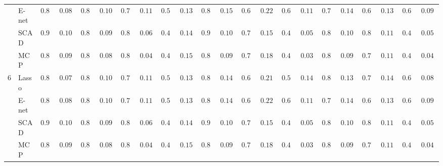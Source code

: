 \begin{tabular}{llllllllllllllllllllll}
	& E-net  & $0.828$ & $0.0854$ & $0.804$ & $0.1024$ & $0.792$ & $0.1169$ & $0.568$ & $0.1325$ & $0.832$ & $0.1576$ & $0.634$ & $0.2203$ & $0.670$ & $0.1115$ & $0.794$ & $0.1462$ & $0.680$ & $0.1303$ & $0.644$ & $0.0925$ \\
	& SCAD  & $0.900$ & $0.1005$ & $0.880$ & $0.0985$ & $0.828$ & $0.0697$ & $0.450$ & $0.1460$ & $0.900$ & $0.1005$ & $0.782$ & $0.1533$ & $0.414$ & $0.0513$ & $0.860$ & $0.1005$ & $0.814$ & $0.1110$ & $0.412$ & $0.0556$ \\
	& MCP  & $0.864$ & $0.0938$ & $0.846$ & $0.0846$ & $0.812$ & $0.0477$ & $0.464$ & $0.1501$ & $0.872$ & $0.0965$ & $0.704$ & $0.1831$ & $0.408$ & $0.0394$ & $0.836$ & $0.0959$ & $0.786$ & $0.1146$ & $0.400$ & $0.0402$ \\
	6 & Lasso  & $0.834$ & $0.0755$ & $0.812$ & $0.1018$ & $0.794$ & $0.1188$ & $0.542$ & $0.1372$ & $0.838$ & $0.1469$ & $0.626$ & $0.2196$ & $0.564$ & $0.1404$ & $0.806$ & $0.1347$ & $0.706$ & $0.1406$ & $0.606$ & $0.0874$ \\
	& E-net  & $0.828$ & $0.0854$ & $0.804$ & $0.1024$ & $0.792$ & $0.1169$ & $0.568$ & $0.1325$ & $0.840$ & $0.1449$ & $0.634$ & $0.2203$ & $0.670$ & $0.1115$ & $0.794$ & $0.1462$ & $0.680$ & $0.1303$ & $0.644$ & $0.0925$ \\
	& SCAD  & $0.900$ & $0.1005$ & $0.880$ & $0.0985$ & $0.828$ & $0.0697$ & $0.450$ & $0.1460$ & $0.902$ & $0.1005$ & $0.782$ & $0.1533$ & $0.414$ & $0.0513$ & $0.860$ & $0.1005$ & $0.814$ & $0.1110$ & $0.412$ & $0.0556$ \\
	& MCP  & $0.864$ & $0.0938$ & $0.846$ & $0.0846$ & $0.812$ & $0.0477$ & $0.464$ & $0.1501$ & $0.868$ & $0.0952$ & $0.704$ & $0.1831$ & $0.408$ & $0.0394$ & $0.836$ & $0.0959$ & $0.786$ & $0.1146$ & $0.400$ & $0.0402$ \\
	\hline 
\end{tabular}